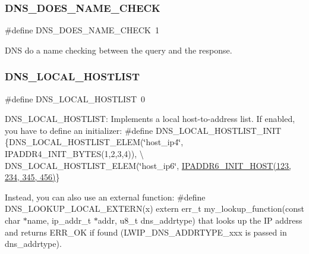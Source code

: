 \subsubsection{\texorpdfstring{D\+N\+S\+\_\+\+D\+O\+E\+S\+\_\+\+N\+A\+M\+E\+\_\+\+C\+H\+E\+CK}{DNS\_DOES\_NAME\_CHECK}\hspace{0.1cm}{\footnotesize\ttfamily [2/2]}}
{\footnotesize\ttfamily \#define D\+N\+S\+\_\+\+D\+O\+E\+S\+\_\+\+N\+A\+M\+E\+\_\+\+C\+H\+E\+CK~1}

D\+NS do a name checking between the query and the response. \mbox{\label{group__lwip__opts__dns_gacba1ac491c1b47b98dfbd0d5c1662659}} 
\subsubsection{\texorpdfstring{D\+N\+S\+\_\+\+L\+O\+C\+A\+L\+\_\+\+H\+O\+S\+T\+L\+I\+ST}{DNS\_LOCAL\_HOSTLIST}\hspace{0.1cm}{\footnotesize\ttfamily [1/2]}}
{\footnotesize\ttfamily \#define D\+N\+S\+\_\+\+L\+O\+C\+A\+L\+\_\+\+H\+O\+S\+T\+L\+I\+ST~0}

D\+N\+S\+\_\+\+L\+O\+C\+A\+L\+\_\+\+H\+O\+S\+T\+L\+I\+ST\+: Implements a local host-\/to-\/address list. If enabled, you have to define an initializer\+: \#define D\+N\+S\+\_\+\+L\+O\+C\+A\+L\+\_\+\+H\+O\+S\+T\+L\+I\+S\+T\+\_\+\+I\+N\+IT \{D\+N\+S\+\_\+\+L\+O\+C\+A\+L\+\_\+\+H\+O\+S\+T\+L\+I\+S\+T\+\_\+\+E\+L\+EM(\char`\"{}host\+\_\+ip4\char`\"{}, I\+P\+A\+D\+D\+R4\+\_\+\+I\+N\+I\+T\+\_\+\+B\+Y\+T\+E\+S(1,2,3,4)), \textbackslash{} D\+N\+S\+\_\+\+L\+O\+C\+A\+L\+\_\+\+H\+O\+S\+T\+L\+I\+S\+T\+\_\+\+E\+L\+EM(\char`\"{}host\+\_\+ip6\char`\"{}, \hyperlink{openmote-cc2538_2lwip_2src_2include_2lwip_2ip__addr_8h_adaff748da2b808995993dd3db5420f08}{I\+P\+A\+D\+D\+R6\+\_\+\+I\+N\+I\+T\+\_\+\+H\+O\+S\+T(123, 234, 345, 456)}\}

Instead, you can also use an external function\+: \#define D\+N\+S\+\_\+\+L\+O\+O\+K\+U\+P\+\_\+\+L\+O\+C\+A\+L\+\_\+\+E\+X\+T\+E\+R\+N(x) extern err\+\_\+t my\+\_\+lookup\+\_\+function(const char $\ast$name, ip\+\_\+addr\+\_\+t $\ast$addr, u8\+\_\+t dns\+\_\+addrtype) that looks up the IP address and returns E\+R\+R\+\_\+\+OK if found (L\+W\+I\+P\+\_\+\+D\+N\+S\+\_\+\+A\+D\+D\+R\+T\+Y\+P\+E\+\_\+xxx is passed in dns\+\_\+addrtype). \mbox{\label{group__lwip__opts__dns_gacba1ac491c1b47b98dfbd0d5c1662659}} 
